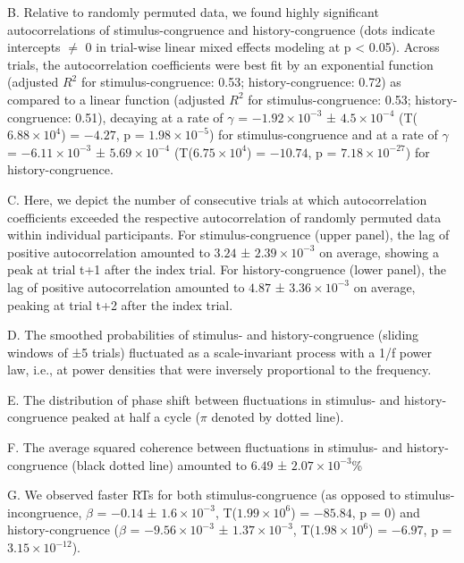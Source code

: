 \documentclass[
]{article}
\begin{document}
B. Relative to randomly permuted data, we found highly significant
autocorrelations of stimulus-congruence and history-congruence (dots
indicate intercepts \(\neq\) 0 in trial-wise linear mixed effects
modeling at p \textless{} 0.05). Across trials, the autocorrelation
coefficients were best fit by an exponential function (adjusted \(R^2\)
for stimulus-congruence: 0.53; history-congruence: 0.72) as compared to
a linear function (adjusted \(R^2\) for stimulus-congruence: 0.53;
history-congruence: 0.51), decaying at a rate of \(\gamma\) =
\(\ensuremath{-1.92\times 10^{-3}}\) ±
\(\ensuremath{4.5\times 10^{-4}}\)
(T(\(\ensuremath{6.88\times 10^{4}}\)) = \(-4.27\), p =
\(\ensuremath{1.98\times 10^{-5}}\)) for stimulus-congruence and at a
rate of \(\gamma\) = \(\ensuremath{-6.11\times 10^{-3}}\) ±
\(\ensuremath{5.69\times 10^{-4}}\)
(T(\(\ensuremath{6.75\times 10^{4}}\)) = \(-10.74\), p =
\(\ensuremath{7.18\times 10^{-27}}\)) for history-congruence.

C. Here, we depict the number of consecutive trials at which
autocorrelation coefficients exceeded the respective autocorrelation of
randomly permuted data within individual participants. For
stimulus-congruence (upper panel), the lag of positive autocorrelation
amounted to \(3.24\) ± \(\ensuremath{2.39\times 10^{-3}}\) on average,
showing a peak at trial t+1 after the index trial. For
history-congruence (lower panel), the lag of positive autocorrelation
amounted to \(4.87\) ± \(\ensuremath{3.36\times 10^{-3}}\) on average,
peaking at trial t+2 after the index trial.

D. The smoothed probabilities of stimulus- and history-congruence
(sliding windows of ±5 trials) fluctuated as a scale-invariant process
with a 1/f power law, i.e., at power densities that were inversely
proportional to the frequency.

E. The distribution of phase shift between fluctuations in stimulus- and
history-congruence peaked at half a cycle (\(\pi\) denoted by dotted
line).

F. The average squared coherence between fluctuations in stimulus- and
history-congruence (black dotted line) amounted to \(6.49\) ±
\(\ensuremath{2.07\times 10^{-3}}\)\%

G. We observed faster RTs for both stimulus-congruence (as opposed to
stimulus-incongruence, \(\beta\) = \(-0.14\) ±
\(\ensuremath{1.6\times 10^{-3}}\),
T(\(\ensuremath{1.99\times 10^{6}}\)) = \(-85.84\), p = \(0\)) and
history-congruence (\(\beta\) = \(\ensuremath{-9.56\times 10^{-3}}\) ±
\(\ensuremath{1.37\times 10^{-3}}\),
T(\(\ensuremath{1.98\times 10^{6}}\)) = \(-6.97\), p =
\(\ensuremath{3.15\times 10^{-12}}\)).
\end{document}
